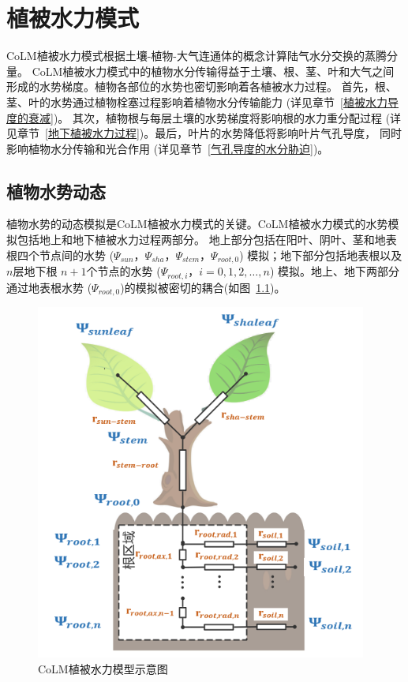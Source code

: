 \chapter{植被水力模式}

CoLM植被水力模式根据土壤-植物-大气连通体的概念计算陆气水分交换的蒸腾分量。
CoLM植被水力模式中的植物水分传输得益于土壤、根、茎、叶和大气之间形成的水势梯度。植物各部位的水势也密切影响着各植被水力过程。
首先，根、茎、叶的水势通过植物栓塞过程影响着植物水分传输能力 (详见章节~\ref{植被水力导度的衰减})。
其次，植物根与每层土壤的水势梯度将影响根的水力重分配过程 (详见章节~\ref{地下植被水力过程})。最后，叶片的水势降低将影响叶片气孔导度，
同时影响植物水分传输和光合作用 (详见章节~\ref{气孔导度的水分胁迫})。


\section{植物水势动态}\label{植物水势动态}
植物水势的动态模拟是CoLM植被水力模式的关键。CoLM植被水力模式的水势模拟包括地上和地下植被水力过程两部分。
地上部分包括在阳叶、阴叶、茎和地表根四个节点间的水势 ($\Psi_{sun}$，$\Psi_{sha}$，$\Psi_{stem}$，$\Psi_{root,0}$)
%
 模拟；地下部分包括地表根以及$n$层地下根 $n+1$个节点的水势 ($\Psi_{root,i}$，$i=0,1,2,\ldots,n$) 模拟。地上、地下两部分通过地表根水势
 ($\Psi_{root,0}$)的模拟被密切的耦合(如图~\ref{fig:CoLM植被水力模型示意图})。

{
\begin{figure}[htb]
\centering
\includegraphics{Figures/植被水力模式/CoLM植被水力模型示意图.png}
\caption{CoLM植被水力模型示意图}
\label{fig:CoLM植被水力模型示意图}
\end{figure}
}


